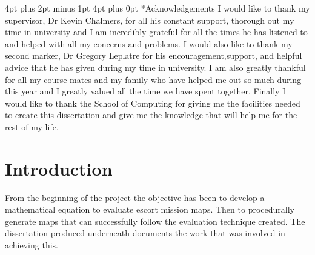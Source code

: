 \documentclass[12pt,a4paper,oneside]{book}
\makeatletter
\renewcommand\section{\@startsection {section}{1}{0mm} %
                               {4pt plus 2pt minus 1pt} %
                               {4pt plus 0pt} %
                               {\bfseries}}
\makeatother
\begin{document}
\listoftables

\listoffigures

\newpage
\section*{Acknowledgements}
I would like to thank my supervisor, Dr Kevin Chalmers, for all his constant support, thorough out my time in university and I am incredibly grateful for all the times he has listened to and helped with all my concerns and problems.  
 \vspace{5mm} 
\newline 
I would also like to thank my second marker, Dr Gregory Leplatre for his  encouragement,support, and helpful advice that he has given during my time in university.
 \vspace{5mm} 
\newline 
I am also greatly  thankful for all my course mates and my family who have helped me out so much during this year and I greatly valued all the time we have spent together. 
 \vspace{5mm} 
\newline 
Finally I would like to thank the School of Computing for giving me the facilities needed to create this dissertation and give me the knowledge that will help me for the rest of my life.
\newpage

\mainmatter

\chapter{Introduction}
From the beginning of the project the objective has been to develop a mathematical equation to evaluate escort mission maps. Then to procedurally generate maps that can successfully follow the evaluation technique created. The dissertation produced underneath documents the work that was involved in achieving this.
\end{document}
